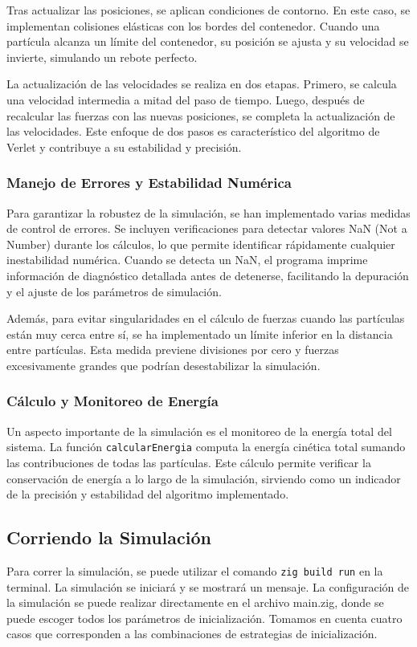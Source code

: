 \documentclass[twocolumn]{article}
\begin{document}
Tras actualizar las posiciones, se aplican condiciones de contorno. En este caso, se implementan colisiones elásticas con los bordes del contenedor. Cuando una partícula alcanza un límite del contenedor, su posición se ajusta y su velocidad se invierte, simulando un rebote perfecto.

La actualización de las velocidades se realiza en dos etapas. Primero, se calcula una velocidad intermedia a mitad del paso de tiempo. Luego, después de recalcular las fuerzas con las nuevas posiciones, se completa la actualización de las velocidades. Este enfoque de dos pasos es característico del algoritmo de Verlet y contribuye a su estabilidad y precisión.

\subsubsection*{Manejo de Errores y Estabilidad Numérica}

Para garantizar la robustez de la simulación, se han implementado varias medidas de control de errores. Se incluyen verificaciones para detectar valores NaN (Not a Number) durante los cálculos, lo que permite identificar rápidamente cualquier inestabilidad numérica. Cuando se detecta un NaN, el programa imprime información de diagnóstico detallada antes de detenerse, facilitando la depuración y el ajuste de los parámetros de simulación.

Además, para evitar singularidades en el cálculo de fuerzas cuando las partículas están muy cerca entre sí, se ha implementado un límite inferior en la distancia entre partículas. Esta medida previene divisiones por cero y fuerzas excesivamente grandes que podrían desestabilizar la simulación.

\subsubsection*{Cálculo y Monitoreo de Energía}

Un aspecto importante de la simulación es el monitoreo de la energía total del sistema. La función \texttt{calcularEnergia} computa la energía cinética total sumando las contribuciones de todas las partículas. Este cálculo permite verificar la conservación de energía a lo largo de la simulación, sirviendo como un indicador de la precisión y estabilidad del algoritmo implementado.
\subsection*{Corriendo la Simulación}
Para correr la simulación, se puede utilizar el comando \texttt{zig build run} en la terminal. La simulación se iniciará y se mostrará un mensaje. La configuración de la simulación se puede realizar directamente en el archivo main.zig, donde se puede escoger todos los parámetros de inicialización.
Tomamos en cuenta cuatro casos que corresponden a las combinaciones de estrategias de inicialización.
\end{document}
